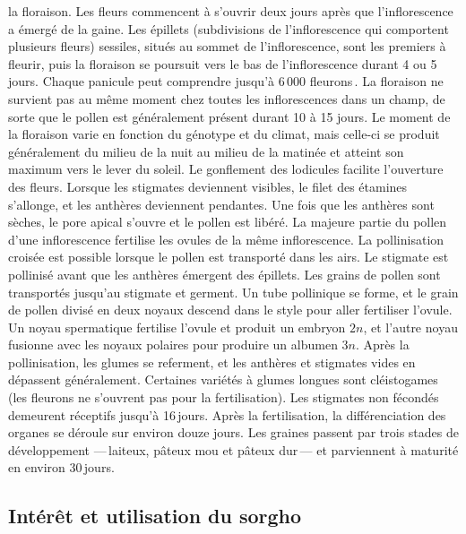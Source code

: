 \documentclass[a4paper,11pt]{article}
\begin{document}
la floraison. Les fleurs commencent à s’ouvrir deux jours après que
l’inflorescence a émergé de la gaine. Les épillets (subdivisions de
l’inflorescence qui comportent plusieurs fleurs) sessiles, situés au
sommet de l’inflorescence, sont les premiers à fleurir, puis la
floraison se poursuit vers le bas de l’inflorescence durant 4 ou 5
jours. Chaque panicule peut comprendre jusqu’à 6\,000
fleurons\,\cite{QUINBYKARPER_1947}. La floraison ne survient pas au
même moment chez toutes les inflorescences dans un champ, de sorte que
le pollen est généralement présent durant 10 à 15 jours. Le moment de
la floraison varie en fonction du génotype et du climat, mais celle-ci
se produit généralement du milieu de la nuit au milieu de la matinée
et atteint son maximum vers le lever du soleil. Le gonflement des
lodicules facilite l’ouverture des fleurs. Lorsque les stigmates
deviennent visibles, le filet des étamines s’allonge, et les anthères
deviennent pendantes. Une fois que les anthères sont sèches, le pore
apical s’ouvre et le pollen est libéré. La majeure partie du pollen
d’une inflorescence fertilise les ovules de la même inflorescence. La
pollinisation croisée est possible lorsque le pollen est transporté
dans les airs. Le stigmate est pollinisé avant que les anthères
émergent des épillets. Les grains de pollen sont transportés jusqu’au
stigmate et germent. Un tube pollinique se forme, et le grain de
pollen divisé en deux noyaux descend dans le style pour aller
fertiliser l’ovule. Un noyau spermatique fertilise l’ovule et produit
un embryon $2n$, et l’autre noyau fusionne avec les noyaux polaires
pour produire un albumen $3n$. Après la pollinisation, les glumes se
referment, et les anthères et stigmates vides en dépassent
généralement. Certaines variétés à glumes longues sont cléistogames
(les fleurons ne s’ouvrent pas pour la fertilisation). Les stigmates
non fécondés demeurent réceptifs jusqu’à 16\,jours. Après la
fertilisation, la différenciation des organes se déroule sur environ
douze jours. Les graines passent par trois stades de développement
---\,laiteux, pâteux mou et pâteux dur\,--- et parviennent à maturité
en environ 30\,jours.

\subsection{Intérêt et utilisation du sorgho}
\end{document}
